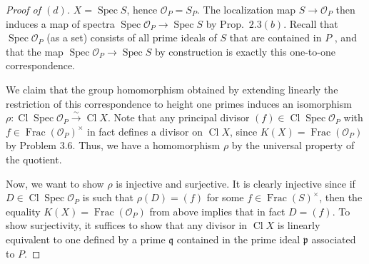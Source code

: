 \documentclass[12pt,letterpaper]{article}
\theoremstyle{definition}
\theoremstyle{remark}
\numberwithin{equation}{section}
\numberwithin{figure}{problem}
\DeclareMathOperator{\Spec}{Spec}
\DeclareMathOperator{\Frac}{Frac}
\DeclareMathOperator{\Cl}{Cl}
\newcommand{\OO}{\mathcal{O}}
\newcommand{\isoto}{\overset{\sim}{\to}}
\begin{document}
\begin{proof}[Proof of $(d)$]
  $X = \Spec S$, hence $\OO_P = S_P$. The localization map $S \to \OO_P$ then induces a map of spectra $\Spec \OO_P \to \Spec S$ by Prop.~$2.3(b)$. Recall that $\Spec \OO_P$ (as a set) consists of all prime ideals of $S$ that are contained in $P$ \cite[Cor.~3.13]{AM69}, and that the map $\Spec \OO_P \to \Spec S$ by construction is exactly this one-to-one correspondence.
  \par We claim that the group homomorphism obtained by extending linearly the restriction of this correspondence to height one primes induces an isomorphism $\rho\colon \Cl \Spec \OO_P \isoto \Cl X$. Note that any principal divisor $(f) \in \Cl \Spec \OO_P$ with $f \in \Frac(\OO_P)^\times$ in fact defines a divisor on $\Cl X$, since $K(X) = \Frac(\OO_P)$ by Problem $3.6$. Thus, we have a homomorphism $\rho$ by the universal property of the quotient.
  \par Now, we want to show $\rho$ is injective and surjective. It is clearly injective since if $D \in \Cl \Spec \OO_P$ is such that $\rho(D) = (f)$ for some $f \in \Frac(S)^\times$, then the equality $K(X) = \Frac(\OO_P)$ from above implies that in fact $D = (f)$. To show surjectivity, it suffices to show that any divisor in $\Cl X$ is linearly equivalent to one defined by a prime $\mathfrak{q}$ contained in the prime ideal $\mathfrak{p}$ associated to $P$.
\end{proof}
\end{document}
